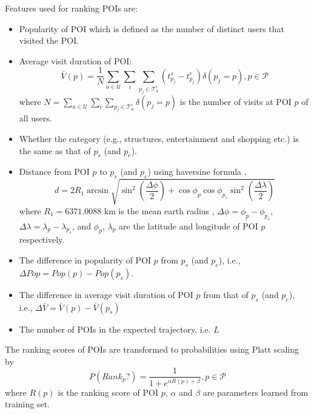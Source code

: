 \documentclass{sig-alternate-05-2015}
\begin{document}
Features used for ranking POIs are:
\begin{itemize}
\item Popularity of POI which is defined as the number of distinct users that visited the POI\cite{ht10}.
\item Average visit duration of POI\cite{ijcai15}:
      \begin{displaymath}
          \bar{V}(p) = \frac{1}{N} \sum_{u \in \mathcal{U}} \sum_i \sum_{p_j \in \mathcal{T}_u^i} (t_{p_j}^s - t_{p_j}^e) \delta(p_j = p),
          p \in \mathcal{P}
      \end{displaymath}
      where $N = \sum_{u \in \mathcal{U}} \sum_i \sum_{p_j \in \mathcal{T}_u^i} \delta(p_j = p)$ 
      is the number of visits at POI $p$ of all users.
\item Whether the category (e.g., structures, entertainment and shopping etc.) is the same as that of $p_s$ (and $p_e$).
\item Distance from POI $p$ to $p_s$ (and $p_e$) using haversine formula \cite{wiki_haversine},
      \begin{displaymath}
      d = 2 R_1 \arcsin \sqrt{ \sin^2 \left( \frac{\Delta \phi}{2} \right) + 
           \cos \phi_p \cos \phi_{p_s} \sin^2 \left( \frac{\Delta \lambda}{2} \right) }
      \end{displaymath}
            where $R_1 = 6371.0088$ km is the mean earth radius \cite{wiki_earth_radius}, 
            $\Delta \phi = \phi_p - \phi_{p_s}$, $\Delta \lambda = \lambda_p - \lambda_{p_s}$,
            and $\phi_p$, $\lambda_p$ are the latitude and longitude of POI $p$ respectively.
\item The difference in popularity of POI $p$ from $p_s$ (and $p_e$),
      i.e., $\Delta Pop = Pop(p) - Pop(p_s)$.
\item The difference in average visit duration of POI $p$ from that of $p_s$ (and $p_e$),
      i.e., $\Delta \bar{V} = \bar{V}(p) - \bar{V}(p_s)$
\item The number of POIs in the expected trajectory, i.e. $L$
\end{itemize}

The ranking scores of POIs are transformed to probabilities using Platt scaling\cite{platt99} by
\begin{displaymath}
    P(Rank_p?) = \frac{1}{1 + e^{\alpha R(p) + \beta}}, p \in \mathcal{P}
\end{displaymath}
where $R(p)$ is the ranking score of POI $p$, $\alpha$ and $\beta$ are parameters learned from training set\cite{plattnote07}.
\end{document}
